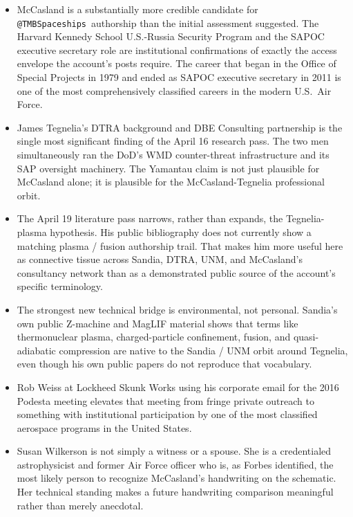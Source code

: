 \documentclass[11pt]{article}
\makeatletter
\newcommand{\account}{\texttt{@TMBSpaceships}}
\makeatother
\begin{document}
\begin{itemize}
  \item McCasland is a substantially more credible candidate for \account\ authorship than the initial assessment suggested. The Harvard Kennedy School U.S.-Russia Security Program and the SAPOC executive secretary role are institutional confirmations of exactly the access envelope the account's posts require. The career that began in the Office of Special Projects in 1979 and ended as SAPOC executive secretary in 2011 is one of the most comprehensively classified careers in the modern U.S.\ Air Force.

  \item James Tegnelia's DTRA background and DBE Consulting partnership is the single most significant finding of the April 16 research pass. The two men simultaneously ran the DoD's WMD counter-threat infrastructure and its SAP oversight machinery. The Yamantau claim is not just plausible for McCasland alone; it is plausible for the McCasland-Tegnelia professional orbit.

  \item The April 19 literature pass narrows, rather than expands, the Tegnelia-plasma hypothesis. His public bibliography does not currently show a matching plasma / fusion authorship trail. That makes him more useful here as connective tissue across Sandia, DTRA, UNM, and McCasland's consultancy network than as a demonstrated public source of the account's specific terminology.

  \item The strongest new technical bridge is environmental, not personal. Sandia's own public Z-machine and MagLIF material shows that terms like thermonuclear plasma, charged-particle confinement, fusion, and quasi-adiabatic compression are native to the Sandia / UNM orbit around Tegnelia, even though his own public papers do not reproduce that vocabulary.

  \item Rob Weiss at Lockheed Skunk Works using his corporate email for the 2016 Podesta meeting elevates that meeting from fringe private outreach to something with institutional participation by one of the most classified aerospace programs in the United States.

  \item Susan Wilkerson is not simply a witness or a spouse. She is a credentialed astrophysicist and former Air Force officer who is, as Forbes identified, the most likely person to recognize McCasland's handwriting on the schematic. Her technical standing makes a future handwriting comparison meaningful rather than merely anecdotal.


\end{itemize}
\end{document}

